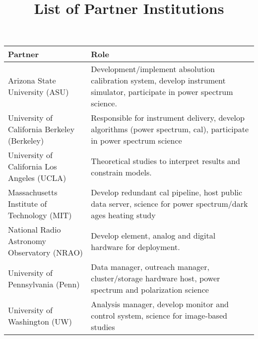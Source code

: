 \documentclass[preprint]{aastex}
\begin{document}
\title{List of Partner Institutions}

\begin{tabular}{| p{} | p{} |} \hline
\textbf{Partner} & \textbf{Role} \\ \hline
Arizona State University (ASU) &  Development/implement absolution calibration system, develop instrument simulator, participate in power spectrum science. \\ \hline
University of California Berkeley (Berkeley) & Responsible for instrument delivery, develop algorithms (power spectrum, cal), participate in power spectrum science \\ \hline
University of California Los Angeles (UCLA) & Theoretical studies to interpret results and constrain models. \\ \hline
Massachusetts Institute of Technology (MIT) & Develop redundant cal pipeline, host public data server, science for power spectrum/dark ages heating study \\ \hline
National Radio Astronomy Observatory (NRAO) & Develop element, analog and digital hardware for deployment. \\ \hline
University of Pennsylvania (Penn) & Data manager, outreach manager, cluster/storage hardware host, power spectrum and polarization science \\ \hline
University of Washington (UW) & Analysis manager, develop monitor and control system, science for image-based studies\\ \hline
\end{tabular}
\end{document}
